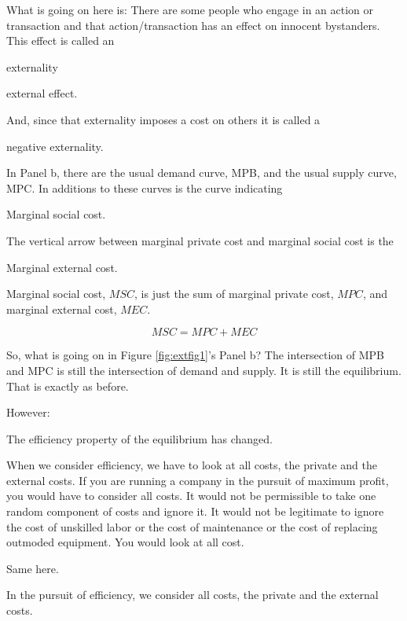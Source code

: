 \documentclass[
]{book}
\begin{document}
What is going on here is: There are some people who engage in an action or transaction and that action/transaction has an effect on innocent bystanders. This effect is called an

\begin{center}
externality

external effect.

\end{center}

And, since that externality imposes a cost on others it is called a

\begin{center}
negative externality.

\end{center}

In Panel b, there are the usual demand curve, MPB, and the usual supply curve, MPC. In additions to these curves is the curve indicating

\begin{center}
Marginal social cost.

The vertical arrow between marginal private cost and marginal social cost is the

Marginal external cost.

\end{center}

Marginal social cost, \(MSC\), is just the sum of marginal private cost, \(MPC\), and marginal external cost, \(MEC\).

\[MSC =  MPC + MEC\]

So, what is going on in Figure \ref{fig:extfig1}'s Panel b? The intersection of MPB and MPC is still the intersection of demand and supply. It is still the equilibrium. That is exactly as before.

However:

The efficiency property of the equilibrium has changed.

When we consider efficiency, we have to look at all costs, the private and the external costs. If you are running a company in the pursuit of maximum profit, you would have to consider all costs. It would not be permissible to take one random component of costs and ignore it. It would not be legitimate to ignore the cost of unskilled labor or the cost of maintenance or the cost of replacing outmoded equipment. You would look at all cost.

Same here.

In the pursuit of efficiency, we consider all costs, the private and the external costs.
\end{document}

